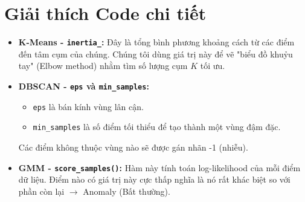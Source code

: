 \documentclass{article}
\begin{document}
\section{Giải thích Code chi tiết}
\begin{itemize}
    \item \textbf{K-Means - \texttt{inertia\_}:} Đây là tổng bình phương khoảng cách từ các điểm đến tâm cụm của chúng. Chúng tôi dùng giá trị này để vẽ "biểu đồ khuỷu tay" (Elbow method) nhằm tìm số lượng cụm $K$ tối ưu.
    \item \textbf{DBSCAN - \texttt{eps} và \texttt{min\_samples}:} 
    \begin{itemize}
        \item \texttt{eps} là bán kính vùng lân cận.
        \item \texttt{min\_samples} là số điểm tối thiểu để tạo thành một vùng đậm đặc.
    \end{itemize}
    Các điểm không thuộc vùng nào sẽ được gán nhãn -1 (nhiễu).
    \item \textbf{GMM - \texttt{score\_samples()}:} Hàm này tính toán log-likelihood của mỗi điểm dữ liệu. Điểm nào có giá trị này cực thấp nghĩa là nó rất khác biệt so với phần còn lại $\rightarrow$ Anomaly (Bất thường).
\end{itemize}
\end{document}
